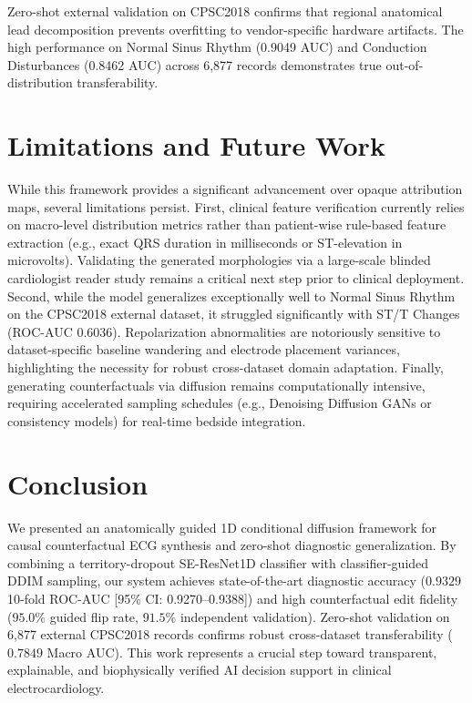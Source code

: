 \documentclass[12pt]{elsarticle}
\begin{document}
Zero-shot external validation on CPSC2018 confirms that regional anatomical lead decomposition prevents overfitting to vendor-specific hardware artifacts. The high performance on Normal Sinus Rhythm (0.9049 AUC) and Conduction Disturbances (0.8462 AUC) across 6,877 records demonstrates true out-of-distribution transferability.

\section{Limitations and Future Work}
\label{sec:limitations}
While this framework provides a significant advancement over opaque attribution maps, several limitations persist. First, clinical feature verification currently relies on macro-level distribution metrics rather than patient-wise rule-based feature extraction (e.g., exact QRS duration in milliseconds or ST-elevation in microvolts). Validating the generated morphologies via a large-scale blinded cardiologist reader study remains a critical next step prior to clinical deployment. Second, while the model generalizes exceptionally well to Normal Sinus Rhythm on the CPSC2018 external dataset, it struggled significantly with ST/T Changes (ROC-AUC 0.6036). Repolarization abnormalities are notoriously sensitive to dataset-specific baseline wandering and electrode placement variances, highlighting the necessity for robust cross-dataset domain adaptation. Finally, generating counterfactuals via diffusion remains computationally intensive, requiring accelerated sampling schedules (e.g., Denoising Diffusion GANs or consistency models) for real-time bedside integration.

\section{Conclusion}
\label{sec:conclusion}
We presented an anatomically guided 1D conditional diffusion framework for causal counterfactual ECG synthesis and zero-shot diagnostic generalization. By combining a territory-dropout SE-ResNet1D classifier with classifier-guided DDIM sampling, our system achieves state-of-the-art diagnostic accuracy ($0.9329$ 10-fold ROC-AUC [95\% CI: 0.9270--0.9388]) and high counterfactual edit fidelity ($95.0\%$ guided flip rate, $91.5\%$ independent validation). Zero-shot validation on 6,877 external CPSC2018 records confirms robust cross-dataset transferability ($0.7849$ Macro AUC). This work represents a crucial step toward transparent, explainable, and biophysically verified AI decision support in clinical electrocardiology.
\end{document}
